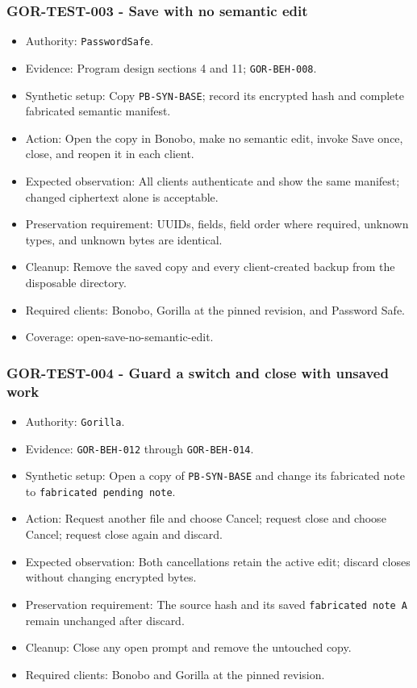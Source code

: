 \documentclass[
  letterpaper,
]{article}
\newcommand{\passthrough}[1]{#1}
\providecommand{\tightlist}{%
  \setlength{\itemsep}{0pt}\setlength{\parskip}{0pt}}
\begin{document}
\subsubsection{GOR-TEST-003 - Save with no semantic edit}\label{gor-test-003---save-with-no-semantic-edit}

\begin{itemize}
\tightlist
\item
  Authority: \nolinkurl{PasswordSafe}.
\item
  Evidence: Program design sections 4 and 11; \nolinkurl{GOR-BEH-008}.
\item
  Synthetic setup: Copy \nolinkurl{PB-SYN-BASE}; record its encrypted hash and complete fabricated semantic manifest.
\item
  Action: Open the copy in Bonobo, make no semantic edit, invoke Save once, close, and reopen it in each client.
\item
  Expected observation: All clients authenticate and show the same manifest; changed ciphertext alone is acceptable.
\item
  Preservation requirement: UUIDs, fields, field order where required, unknown types, and unknown bytes are identical.
\item
  Cleanup: Remove the saved copy and every client-created backup from the disposable directory.
\item
  Required clients: Bonobo, Gorilla at the pinned revision, and Password Safe.
\item
  Coverage: open-save-no-semantic-edit.
\end{itemize}

\subsubsection{GOR-TEST-004 - Guard a switch and close with unsaved
work}\label{gor-test-004---guard-a-switch-and-close-with-unsaved-work}

\begin{itemize}
\tightlist
\item
  Authority: \passthrough{\lstinline!Gorilla!}.
\item
  Evidence: \nolinkurl{GOR-BEH-012} through \nolinkurl{GOR-BEH-014}.
\item
  Synthetic setup: Open a copy of \nolinkurl{PB-SYN-BASE} and change its fabricated note to
  \passthrough{\lstinline!fabricated pending note!}.
\item
  Action: Request another file and choose Cancel; request close and choose Cancel; request close again and discard.
\item
  Expected observation: Both cancellations retain the active edit; discard closes without changing encrypted bytes.
\item
  Preservation requirement: The source hash and its saved \passthrough{\lstinline!fabricated note A!} remain unchanged
  after discard.
\item
  Cleanup: Close any open prompt and remove the untouched copy.
\item
  Required clients: Bonobo and Gorilla at the pinned revision.
\end{itemize}
\end{document}
